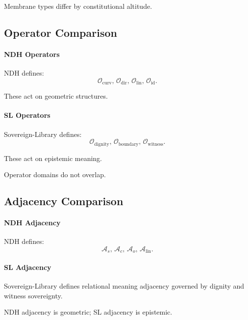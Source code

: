 Membrane types differ by constitutional altitude.


\subsection{Operator Comparison}

\paragraph{NDH Operators}
NDH defines:
\[
\mathcal{O}_{\mathrm{curv}},\,
\mathcal{O}_{\mathrm{dir}},\,
\mathcal{O}_{\mathrm{lin}},\,
\mathcal{O}_{\mathrm{id}}.
\]

These act on geometric structures.

\paragraph{SL Operators}
Sovereign-Library defines:
\[
\mathcal{O}_{\mathrm{dignity}},\,
\mathcal{O}_{\mathrm{boundary}},\,
\mathcal{O}_{\mathrm{witness}}.
\]

These act on epistemic meaning.

Operator domains do not overlap.


\subsection{Adjacency Comparison}

\paragraph{NDH Adjacency}
NDH defines:
\[
\mathcal{A}_s,\,
\mathcal{A}_c,\,
\mathcal{A}_o,\,
\mathcal{A}_{\mathrm{lin}}.
\]

\paragraph{SL Adjacency}
Sovereign-Library defines relational meaning adjacency governed by dignity
and witness sovereignty.

NDH adjacency is geometric; SL adjacency is epistemic.

